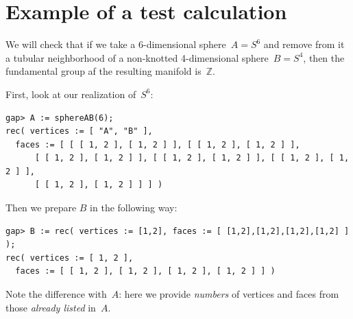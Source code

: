 \documentclass{article}
\begin{document}
\section{Example of a test calculation}\label{sec:test}

We will check that if we take a 6-dimensional sphere~$A=S^6$ and remove from it a tubular neighborhood of a non-knotted 4-dimensional sphere~$B=S^4$, then the fundamental group af the resulting manifold is~$\mathbb Z$.

First, look at our realization of~$S^6$:
\begin{verbatim}
gap> A := sphereAB(6);
rec( vertices := [ "A", "B" ], 
  faces := [ [ [ 1, 2 ], [ 1, 2 ] ], [ [ 1, 2 ], [ 1, 2 ] ], 
      [ [ 1, 2 ], [ 1, 2 ] ], [ [ 1, 2 ], [ 1, 2 ] ], [ [ 1, 2 ], [ 1, 2 ] ], 
      [ [ 1, 2 ], [ 1, 2 ] ] ] )
\end{verbatim}
Then we prepare $B$ in the following way:
\begin{verbatim}
gap> B := rec( vertices := [1,2], faces := [ [1,2],[1,2],[1,2],[1,2] ] );
rec( vertices := [ 1, 2 ], 
  faces := [ [ 1, 2 ], [ 1, 2 ], [ 1, 2 ], [ 1, 2 ] ] )
\end{verbatim}
Note the difference with~$A$: here we provide \emph{numbers} of vertices and faces from those \emph{already listed} in~$A$. 
\end{document}
